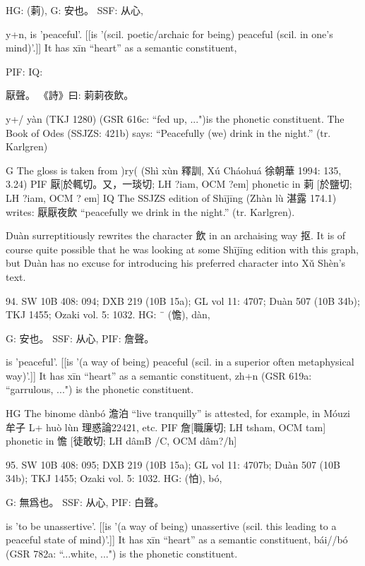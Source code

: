 HG:   (䓶),
G:	安也。
SSF: 从心,

y+n,
is 'peaceful'. [[is '(scil. poetic/archaic for being) peaceful (scil. in one's mind)'.]]
It has xīn ``heart'' as a semantic constituent,

PIF: IQ:

厭聲。
《詩》曰: 䓶䓶夜飲。

y+/ yàn (TKJ 1280) (GSR 616c: ``fed up, ...")is the phonetic constituent.
The Book of Odes (SSJZS: 421b) says: ``Peacefully (we) drink in the night.'' (tr. Karlgren)

G	The gloss is taken from )ry( (Shì xùn 釋訓, Xú Cháohuá 徐朝華 1994: 135, 3.24)
PIF     厭[於輒切。又，一琰切; LH ?iam, OCM ?em] phonetic in 䓶 [於鹽切; LH ?iam, OCM ? em]
IQ	The SSJZS edition of Shījīng (Zhàn lù 湛露 174.1) writes: 厭厭夜飲 ``peacefully we drink in the night.'' (tr. Karlgren).



    Duàn surreptitiously rewrites the character 飲 in an archaising way 抠. It is of course quite possible that he was looking at some Shījīng edition with this graph, but Duàn has no excuse for introducing his preferred character into Xǔ Shèn's text.


94. SW 10B 408: 094; DXB 219 (10B 15a); GL vol 11: 4707; Duàn 507 (10B 34b); TKJ 1455; Ozaki vol. 5: 1032.
HG: ¨ (憺), dàn,

G:	安也。
SSF: 从心,
PIF: 詹聲。

is 'peaceful'. [[is '(a way of being) peaceful (scil. in a superior often metaphysical way)'.]]
It has xīn ``heart'' as a semantic constituent,
zh+n (GSR 619a: ``garrulous, ...") is the phonetic constituent.

HG      The binome dànbó 澹泊 ``live tranquilly'' is attested, for example, in Móuzi 牟子 L+ huò lùn
理惑論22421, etc.
PIF     詹[職廉切; LH tsham, OCM tam] phonetic in 憺 [徒敢切; LH dâmB /C, OCM dâm?/h]

95. SW 10B 408: 095; DXB 219 (10B 15a); GL vol 11: 4707b; Duàn 507 (10B 34b); TKJ 1455; Ozaki vol. 5: 1032.
HG:             (怕), bó,

G:	無爲也。
SSF: 从心,
PIF: 白聲。

is 'to be unassertive'. [[is '(a way of being) unassertive (scil. this leading to a peaceful state of mind)'.]]
It has xīn ``heart'' as a semantic constituent,
bái//bó (GSR 782a: ``...white, ...") is the phonetic constituent.


